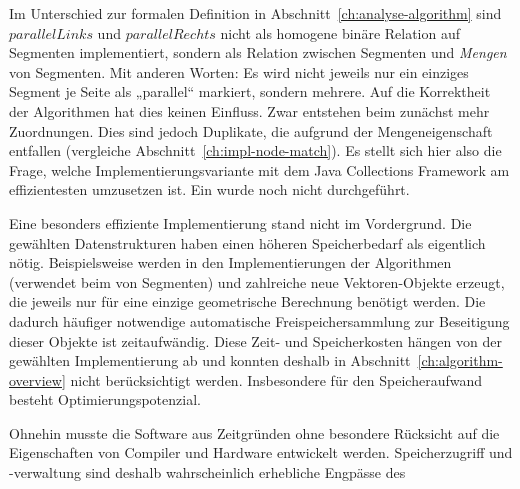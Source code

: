\documentclass[../main/thesis.tex]{subfiles}
\begin{document}
Im Unterschied zur formalen Definition in Abschnitt~\ref{ch:analyse-algorithm} sind $parallelLinks$ und $parallelRechts$ nicht als homogene binäre Relation auf Segmenten implementiert, sondern als Relation zwischen Segmenten und \emph{Mengen} von Segmenten.
Mit anderen Worten: Es wird nicht jeweils nur ein einziges Segment je Seite als „parallel“ markiert, sondern mehrere.
Auf die Korrektheit der Algorithmen hat dies keinen Einfluss.
Zwar entstehen beim  zunächst mehr Zuordnungen.
Dies sind jedoch Duplikate, die aufgrund der Mengeneigenschaft entfallen (vergleiche Abschnitt~\ref{ch:impl-node-match}).
Es stellt sich hier also die Frage, welche Implementierungsvariante mit dem Java Collections Framework am effizientesten umzusetzen ist.
Ein  wurde noch nicht durchgeführt.

Eine besonders effiziente Implementierung stand nicht im Vordergrund.
Die gewählten Datenstrukturen haben einen höheren Speicherbedarf als eigentlich nötig.
Beispielsweise werden in den Implementierungen der Algorithmen  (verwendet beim  von Segmenten) und  zahlreiche neue Vektoren-Objekte erzeugt, die jeweils nur für eine einzige geometrische Berechnung benötigt werden.
Die dadurch häufiger notwendige automatische Freispeichersammlung  zur Beseitigung dieser Objekte ist zeitaufwändig.
Diese Zeit- und Speicherkosten hängen von der gewählten Implementierung ab und konnten deshalb in Abschnitt~\ref{ch:algorithm-overview} nicht berücksichtigt werden.
Insbesondere für den Speicheraufwand besteht Optimierungspotenzial.


Ohnehin musste die Software aus Zeitgründen ohne besondere Rücksicht auf die Eigenschaften von Compiler und Hardware entwickelt werden.
Speicherzugriff und -verwaltung sind deshalb wahrscheinlich erhebliche Engpässe des 
\end{document}
